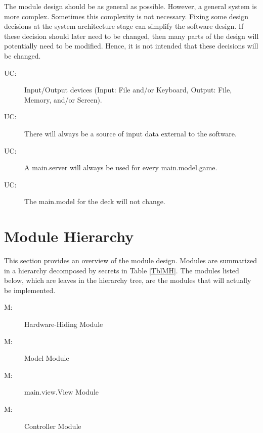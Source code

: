 \documentclass[12pt, titlepage]{article}
\newcounter{ucnum}
\newcommand{\uctheucnum}{UC\theucnum}
\newcounter{mnum}
\newcommand{\mthemnum}{M\themnum}
\begin{document}
The module design should be as general as possible. However, a general system is
more complex. Sometimes this complexity is not necessary. Fixing some design
decisions at the system architecture stage can simplify the software design. If
these decision should later need to be changed, then many parts of the design
will potentially need to be modified. Hence, it is not intended that these
decisions will be changed.

\begin{description}
\item[ \uctheucnum \label{ucIO}:] Input/Output devices (Input: File and/or Keyboard, Output: File, Memory, and/or Screen).
\item[ \uctheucnum \label{ucInput}:] There will always be a source of input data external to the software.
\item[ \uctheucnum:] A main.server will always be used for every main.model.game.
\item[ \uctheucnum:] The main.model for the deck will not change.
\end{description}

\section{Module Hierarchy} \label{SecMH}

This section provides an overview of the module design. Modules are summarized
in a hierarchy decomposed by secrets in Table \ref{TblMH}. The modules listed
below, which are leaves in the hierarchy tree, are the modules that will
actually be implemented.

\begin{description}
\item [ \mthemnum \label{mHH}:] Hardware-Hiding Module
\item [ \mthemnum \label{mModel}:] Model Module
\item [ \mthemnum \label{mView}:] main.view.View Module
\item [ \mthemnum \label{mController}:] Controller Module
\end{description}
\end{document}
